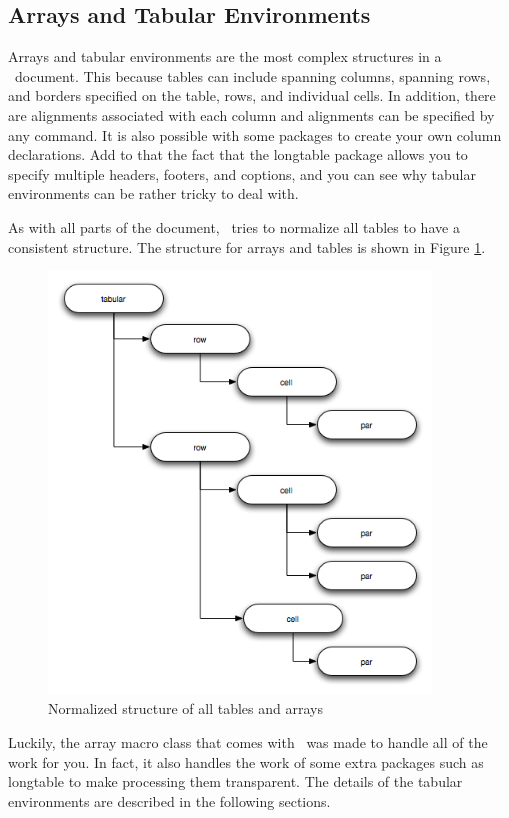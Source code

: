 \subsection{Arrays and Tabular Environments\label{sec:arrays}}

Arrays and tabular environments are the most complex structures in a 
\plasTeX\ document.  This because tables can include spanning columns,
spanning rows, and borders specified on the table, rows, and individual 
cells.  In addition, there are alignments associated with each column
and alignments can be specified by any  command.
It is also possible with some packages to create your own column 
declarations.  Add to that the fact that the longtable package allows
you to specify multiple headers, footers, and coptions, and you can see
why tabular environments can be rather tricky to deal with.

As with all parts of the document, \plasTeX\ tries to normalize all tables
to have a consistent structure.  The structure for arrays and tables is 
shown in Figure \ref{fig:tablestruct}.
\begin{figure}[ht]
\begin{center}
\includegraphics[width=4in]{tablestruct}
\end{center}
\caption{Normalized structure of all tables and arrays\label{fig:tablestruct}}
\end{figure}

Luckily, the array macro class that comes with \plasTeX\ was made to handle
all of the work for you.  In fact, it also handles the work of some extra 
packages such as longtable to make processing them transparent. The details
of the tabular environments are described in the following sections.

